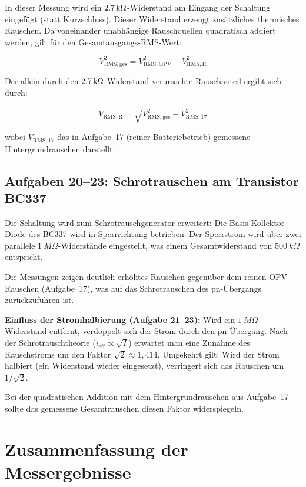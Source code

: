 \documentclass[12pt,a4paper]{article}
\begin{document}
In dieser Messung wird ein $\SI{2{,}7}{k\Omega}$-Widerstand am Eingang
der Schaltung eingefügt (statt Kurzschluss). Dieser Widerstand erzeugt
zusätzliches thermisches Rauschen. Da voneinander unabhängige Rauschquellen
quadratisch addiert werden, gilt für den Gesamtausgangs-RMS-Wert:

\begin{equation}
  V_\mathrm{RMS,ges}^2 = V_\mathrm{RMS,OPV}^2 + V_\mathrm{RMS,R}^2
\end{equation}

Der allein durch den $\SI{2{,}7}{k\Omega}$-Widerstand verursachte
Rauschanteil ergibt sich durch:

\begin{equation}
  V_\mathrm{RMS,R} = \sqrt{V_\mathrm{RMS,ges}^2 - V_\mathrm{RMS,17}^2}
\end{equation}

wobei $V_\mathrm{RMS,17}$ das in Aufgabe~17 (reiner Batteriebetrieb)
gemessene Hintergrundrauschen darstellt.

\subsection{Aufgaben 20--23: Schrotrauschen am Transistor BC337}

Die Schaltung wird zum Schrotrauschgenerator erweitert: Die
Basis-Kollektor-Diode des BC337 wird in Sperrrichtung betrieben.
Der Sperrstrom wird über zwei parallele $\SI{1}{M\Omega}$-Widerstände
eingestellt, was einem Gesamtwiderstand von $\SI{500}{k\Omega}$ entspricht.

Die Messungen zeigen deutlich erhöhtes Rauschen gegenüber dem reinen
OPV-Rauschen (Aufgabe~17), was auf das Schrotrauschen des pn-Übergangs
zurückzuführen ist.

\medskip
\noindent\textbf{Einfluss der Stromhalbierung (Aufgabe 21--23):}
Wird ein $\SI{1}{M\Omega}$-Widerstand entfernt, verdoppelt sich der
Strom durch den pn-Übergang. Nach der Schrotrauschtheorie
($i_\mathrm{eff} \propto \sqrt{I}$) erwartet man eine Zunahme des
Rauschstroms um den Faktor $\sqrt{2} \approx 1{,}414$. Umgekehrt gilt:
Wird der Strom halbiert (ein Widerstand wieder eingesetzt), verringert
sich das Rauschen um $1/\sqrt{2}$.

Bei der quadratischen Addition mit dem Hintergrundrauschen aus
Aufgabe~17 sollte das gemessene Gesamtrauschen diesen Faktor widerspiegeln.

\section{Zusammenfassung der Messergebnisse}
\end{document}
